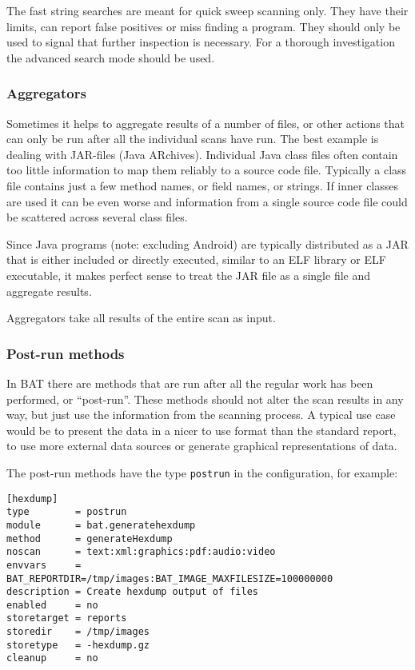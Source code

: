 \documentclass[10pt]{article}
\begin{document}
The fast string searches are meant for quick sweep scanning only. They have
their limits, can report false positives or miss finding a program. They should
only be used to signal that further inspection is necessary. For a thorough
investigation the advanced search mode should be used.

\subsubsection{Aggregators}

Sometimes it helps to aggregate results of a number of files, or other actions
that can only be run after all the individual scans have run. The best example
is dealing with JAR-files (Java ARchives). Individual Java class files often
contain too little information to map them reliably to a source code file.
Typically a class file contains just a few method names, or field names, or
strings. If inner classes are used it can be even worse and information from a
single source code file could be scattered across several class files.

Since Java programs (note: excluding Android) are typically distributed as a
JAR that is either included or directly executed, similar to an ELF library or
ELF executable, it makes perfect sense to treat the JAR file as a single file
and aggregate results.

Aggregators take all results of the entire scan as input.

\subsubsection{Post-run methods}

In BAT there are methods that are run after all the regular work has been
performed, or ``post-run''. These methods should not alter the scan results in
any way, but just use the information from the scanning process. A typical use
case would be to present the data in a nicer to use format than the standard
report, to use more external data sources or generate graphical representations
of data.

The post-run methods have the type \texttt{postrun} in the configuration, for
example:

\begin{verbatim}
[hexdump]
type        = postrun
module      = bat.generatehexdump
method      = generateHexdump
noscan      = text:xml:graphics:pdf:audio:video
envvars     = BAT_REPORTDIR=/tmp/images:BAT_IMAGE_MAXFILESIZE=100000000
description = Create hexdump output of files
enabled     = no
storetarget = reports
storedir    = /tmp/images
storetype   = -hexdump.gz
cleanup     = no
\end{verbatim}
\end{document}
